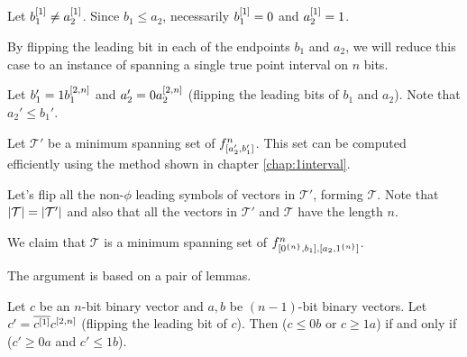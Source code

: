Let $b_1^{[1]} \neq a_2^{[1]}$.
Since $b_1 \leq a_2$,
necessarily $b_1^{[1]} = 0$ and $a_2^{[1]} = 1$.

By flipping the leading bit in each of the endpoints
$b_1$ and $a_2$,
we will reduce this case
to an instance of spanning a single true point interval
on $n$ bits.


Let $b_1' = 1 b_1^{[2, n]}$
and $a_2' = 0 a_2^{[2, n]}$
(flipping the leading bits of $b_1$ and $a_2$).
Note that $a_2' \leq b_1'$.

Let $\mathcal{T}'$ be a minimum spanning set
of $f^{n}_{[a_2', b_1']}$.
This set can be computed efficiently
using the method shown
in chapter \ref{chap:1interval}.

Let's flip all the non-$\phi$ leading symbols
of vectors in $\mathcal{T}'$,
forming $\mathcal{T}$.
Note that $\lvert\mathcal{T}\rvert = \lvert\mathcal{T}'\rvert$
and also that all the vectors in $\mathcal{T}'$
and $\mathcal{T}$ have the length $n$.

We claim that $\mathcal{T}$ is a minimum spanning set
of $f^{n}_{[0^{\{n\}}, b_1], [a_2, 1^{\{n\}}]}$.

The argument is based on a pair of lemmas.

\begin{lemma}
\label{lemma:cflip}
Let $c$ be an $n$-bit binary vector
and $a, b$ be $(n-1)$-bit binary vectors.
Let $c' = \overline{c^{[1]}} c^{[2, n]}$
(flipping the leading bit of $c$).
Then ($c \leq 0 b$ or $c \geq 1 a$)
if and only if
($c' \geq 0 a$ and $c' \leq 1 b$).
\end{lemma}

